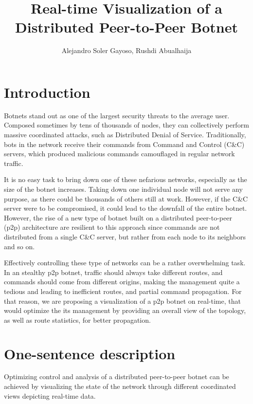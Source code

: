 \documentclass{proc}
\begin{document}
\title{Real-time Visualization of a Distributed Peer-to-Peer Botnet}

\author{Alejandro Soler Gayoso, Rushdi Abualhaija}

\maketitle

\section{Introduction}
Botnets stand out as one of the largest security threats to the average user. Composed sometimes by tens of thousands of nodes, they can collectively perform massive coordinated attacks, such as Distributed Denial of Service. Traditionally, bots in the network receive their commands from Command and Control (C&C) servers, which produced malicious commands camouflaged in regular network traffic. 


It is no easy task to bring down one of these nefarious networks, especially as the size of the botnet increases. Taking down one individual node will not serve any purpose, as there could be thousands of others still at work. However, if the C&C server were to be compromised, it could lead to the downfall of the entire botnet. However, the rise of a new type of botnet built on a distributed peer-to-peer (p2p) architecture are resilient to this approach since commands are not distributed from a single C&C server, but rather from each node to its neighbors and so on. 


Effectively controlling these type of networks can be a rather overwhelming task. In an stealthy p2p botnet, traffic should always take different routes, and commands should come from different origins, making the management quite a tedious and leading to inefficient routes, and partial command propagation. For that reason, we are proposing a visualization of a p2p botnet on real-time, that would optimize the its management by providing an overall view of the topology, as well as route statistics, for better propagation. 

\section{One-sentence description}
Optimizing control and analysis of a distributed peer-to-peer botnet can be achieved by visualizing the state of the network through different coordinated views depicting real-time data.
\end{document}
